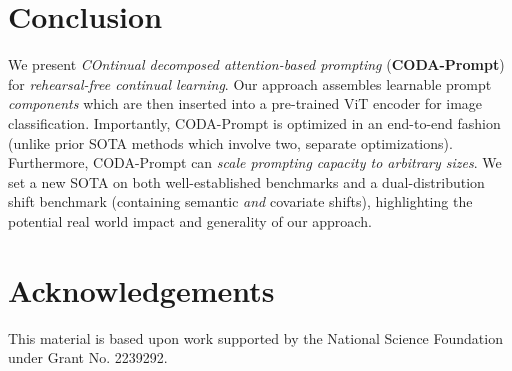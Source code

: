 \section{Conclusion}
\label{conclusion}

We present \emph{COntinual decomposed attention-based prompting} (\textbf{CODA-Prompt}) for \emph{rehearsal-free continual learning}. Our approach assembles learnable prompt \emph{components} which are then inserted into a pre-trained ViT encoder for image classification. Importantly, CODA-Prompt is optimized in an end-to-end fashion (unlike prior SOTA methods which involve two, separate optimizations). Furthermore, CODA-Prompt can \emph{scale prompting capacity to arbitrary sizes}. We set a new SOTA on both well-established benchmarks and a dual-distribution shift benchmark (containing semantic \emph{and} covariate shifts), highlighting the potential real world impact and generality of our approach.

\section*{Acknowledgements}

This material is based upon work supported by the National Science Foundation under Grant No. 2239292.